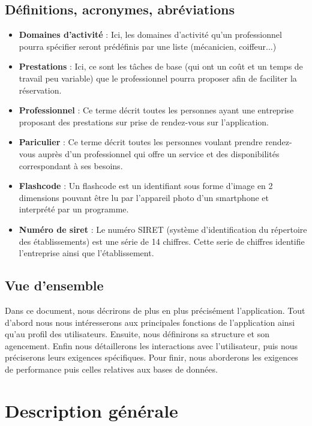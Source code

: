 \documentclass{article}
\begin{document}
\subsection{Définitions, acronymes, abréviations}
\begin{itemize}
\item \textbf{Domaines d'activité} : Ici, les domaines d'activité qu'un professionnel pourra spécifier seront prédéfinis par une liste (mécanicien, coiffeur...)

\item \textbf{Prestations} : Ici, ce sont les tâches de base
(qui ont un coût et un temps de travail peu variable) que le professionnel pourra proposer afin de faciliter la réservation.
\item \textbf{Professionnel} : Ce terme décrit toutes les personnes ayant une entreprise proposant des
  prestations sur prise de rendez-vous sur l'application.
\item \textbf{Pariculier} : Ce terme décrit toutes les personnes
  voulant prendre rendez-vous auprès d'un professionnel qui offre un service et des disponibilités correspondant à ses besoins.
\item \textbf{Flashcode} : Un flashcode est un identifiant sous forme
  d'image en 2 dimensions pouvant être lu par l'appareil photo d'un smartphone et
  interprété par un programme.
\item \textbf{Numéro de siret} : Le numéro SIRET (système d'identification du répertoire des établissements) est une série de 14 chiffres.
Cette serie de chiffres identifie l'entreprise ainsi que l'établissement.
\end{itemize}


\subsection{Vue d'ensemble}
Dans ce document, nous décrirons de plus en plus précisément l'application.
Tout d'abord nous nous intéresserons aux principales fonctions de l'application ainsi qu'au profil des utilisateurs.
Ensuite, nous définirons sa structure et son agencement. 
Enfin nous détaillerons les interactions avec l'utilisateur, puis nous préciserons leurs exigences spécifiques.
Pour finir, nous aborderons les exigences de performance puis celles relatives aux bases de données.

\section{Description générale}
\end{document}
